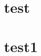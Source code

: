 \documentclass[a4paper,8pt]{article} %
\begin{document}
\section{test}
\pagebreak
\section{test1}
\end{document}
